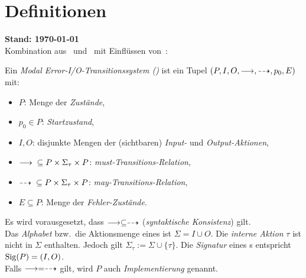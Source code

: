 \chapter{Definitionen}
{\large\textbf{Stand: \today{}}}\\

Kombination aus~\cite{Vogler2015FailSem} und~\cite{Schinko2016BA} mit
Einflüssen von~\cite{Vogler2016MIA3}:

\begin{Def}
  Ein \emph{Modal Error-I/O-Transitionssystem (\MEIO{})} ist ein Tupel
  $(P,I,O,\must,\may,p_0,E)$ mit:
  \begin{itemize}
    \item $P$: Menge der \emph{Zustände},
    \item $p_0\in P$: \emph{Startzustand},
    \item $I,O$: disjunkte Mengen der (sichtbaren) \emph{Input-} und
      \emph{Output-Aktionen},
    \item $\must{} \subseteq P\times \Sigma_{\tau}\times P$:
      \emph{must-Transitions-Relation},
    \item $\may{} \subseteq P\times \Sigma_{\tau}\times P$:
      \emph{may-Transitions-Relation},
    \item $E\subseteq P$: Menge der \emph{Fehler-Zustände}.
  \end{itemize}
  Es wird vorausgesetzt, dass $\must\subseteq\may$ (\emph{syntaktische
  Konsistenz}) gilt.\\
  Das \emph{Alphabet} bzw.\ die Aktionsmenge eines \MEIO{} ist $\Sigma = I\cup
  O$. Die \emph{interne Aktion} $\tau$ ist nicht in $\Sigma$ enthalten. Jedoch
  gilt $\Sigma_{\tau} := \Sigma \cup \{\tau\}$. Die \emph{Signatur} eines
  \MEIO{}s entspricht $\mathrm{Sig} (P)=(I,O)$.\\
  Falls $\must =\may$ gilt, wird $P$ auch \emph{Implementierung} genannt.
\end{Def}

